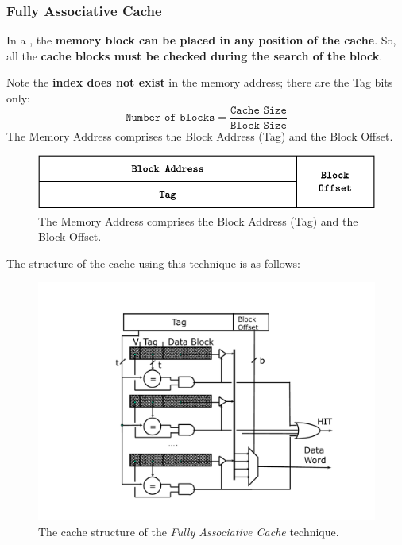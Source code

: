 \newpage

\label{Fully Associative Cache}
\hypertarget{Fully Associative Cache}{\subsubsection*{\textcolor{Red2}{Fully Associative Cache}}}

In a , the \textbf{memory block can be placed in any position of the cache}. So, all the \textbf{cache blocks must be checked during the search of the block}.

\highspace
Note the \textbf{index does not exist} in the memory address; there are the Tag bits only:
\begin{equation}\label{eq: Fully Associative Cache}
    \texttt{Number of blocks} = \dfrac{\texttt{Cache Size}}{\texttt{Block Size}}
\end{equation}
The Memory Address comprises the Block Address (Tag) and the Block Offset.

\begin{figure}[!htp]
    \centering
    \includegraphics[width=.9\textwidth]{img/fully-associative-cache-1.pdf}
    \caption{The Memory Address comprises the Block Address (Tag) and the Block Offset.}
\end{figure}

\noindent
The structure of the cache using this technique is as follows:

\begin{figure}[!htp]
    \centering
    \includegraphics[width=.7\textwidth]{img/fully-associative-cache-2.pdf}
    \caption{The cache structure of the \emph{Fully Associative Cache} technique.}
    \label{fig: cache structure of the Fully Associative Cache}
\end{figure}

